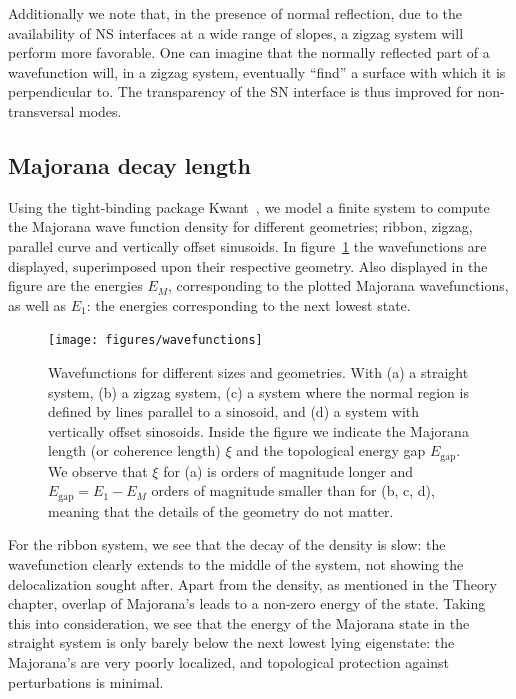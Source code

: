 			Additionally we note that, in the presence of normal reflection, due to the availability of NS interfaces at a wide range of slopes, a zigzag system will perform more favorable.
			One can imagine that the normally reflected part of a wavefunction will, in a zigzag system, eventually ``find'' a surface with which it is perpendicular to.
			The transparency of the SN interface is thus improved for non-transversal modes.

		\subsection{Majorana decay length}

			Using the tight-binding package Kwant~\cite{groth_kwant:_2014}, we model a finite system to compute the Majorana wave function density for different geometries; ribbon, zigzag, parallel curve and vertically offset sinusoids.
			In figure~\ref{fig:wavefunctions} the wavefunctions are displayed, superimposed upon their respective geometry.
			Also displayed in the figure are the energies $E_M$, corresponding to the plotted Majorana wavefunctions, as well as $E_1$: the energies corresponding to the next lowest state.

			\begin{figure}[!htb]
			\centering
			\texttt{[image: figures/wavefunctions]}
			\caption{Wavefunctions for different sizes and geometries.
			With (a) a straight system, (b) a zigzag system, (c) a system where the normal region is defined by lines parallel to a sinosoid, and (d) a system with vertically offset sinosoids.
			Inside the figure we indicate the Majorana length (or coherence length) $\xi$ and the topological energy gap $E_\textrm{gap}$.
			We observe that $\xi$ for (a) is orders of magnitude longer and $E_\textrm{gap} = E_\textrm{1} - E_M$ orders of magnitude smaller than for (b, c, d), meaning that the details of the geometry do not matter.
			\label{fig:wavefunctions}}
			\end{figure}

			For the ribbon system, we see that the decay of the density is slow: the wavefunction clearly extends to the middle of the system, not showing the delocalization sought after.
			Apart from the density, as mentioned in the Theory chapter, overlap of Majorana's leads to a non-zero energy of the state.
			Taking this into consideration, we see that the energy of the Majorana state in the straight system is only barely below the next lowest lying eigenstate: the Majorana's are very poorly localized, and topological protection against perturbations is minimal.
			
